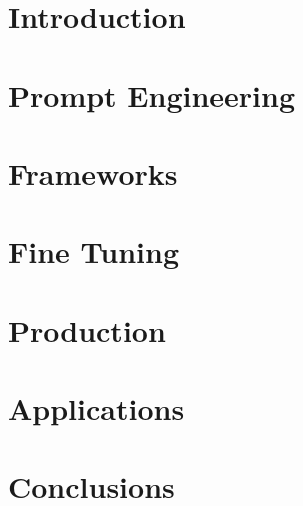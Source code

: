 \section[Intro]{Introduction}






\section[Prompts]{Prompt Engineering}


\section[Frameworks]{Frameworks}








\section[Consult]{Fine Tuning}


\section[Prod]{Production}


\section[Apps]{Applications}


\section[Concl]{Conclusions}





